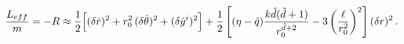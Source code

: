 \begin{equation}
\frac{L_{eff}}{m} = - R  \approx \frac{1}{2} \Bigl[ (\delta
\dot{r})^2 + r_0^2 \, (\delta \dot{\theta})^2 + (\delta
\dot{y}^i)^2 \Bigr] + \frac{1}{2} \left[ (\eta - \hat{q}) \frac{k
\tilde{d} (\tilde{d} +1)}{r_0^{\tilde{d}+2}} -  3
\left(\frac{\ell}{r_0^2} \right)^2 \right] (\delta r)^2 \, .
\end{equation}

